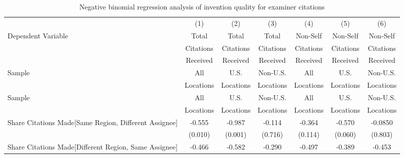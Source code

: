 \begin{table}[htbp]\centering
\caption{Negative binomial regression analysis of invention quality for examiner citations \label{e.model123192021}}
\small
\onehalfspacing
\begin{adjustbox}{angle=90}
\begin{tabular}{l*{6}{c}}
\hline\hline
                &\multicolumn{1}{c}{(1)}&\multicolumn{1}{c}{(2)}&\multicolumn{1}{c}{(3)}&\multicolumn{1}{c}{(4)}&\multicolumn{1}{c}{(5)}&\multicolumn{1}{c}{(6)}\\
 \multirow{3}{*}{Dependent Variable} &\multicolumn{1}{c}{Total}&\multicolumn{1}{c}{Total}&\multicolumn{1}{c}{Total}&\multicolumn{1}{c}{Non-Self}&\multicolumn{1}{c}{Non-Self}&\multicolumn{1}{c}{Non-Self}\\
                &\multicolumn{1}{c}{Citations}&\multicolumn{1}{c}{Citations}&\multicolumn{1}{c}{Citations}&\multicolumn{1}{c}{Citations}&\multicolumn{1}{c}{Citations}&\multicolumn{1}{c}{Citations}\\
                 &\multicolumn{1}{c}{Received}&\multicolumn{1}{c}{Received}&\multicolumn{1}{c}{Received}&\multicolumn{1}{c}{Received}&\multicolumn{1}{c}{Received}&\multicolumn{1}{c}{Received}\\
                 \hline
 \multirow{2}{*}{Sample}&\multicolumn{1}{c}{All}&\multicolumn{1}{c}{U.S.}&\multicolumn{1}{c}{Non-U.S.}&\multicolumn{1}{c}{All}&\multicolumn{1}{c}{U.S.}&\multicolumn{1}{c}{Non-U.S.}\\       
  &\multicolumn{1}{c}{Locations}&\multicolumn{1}{c}{Locations}&\multicolumn{1}{c}{Locations}&\multicolumn{1}{c}{Locations}&\multicolumn{1}{c}{Locations}&\multicolumn{1}{c}{Locations}\\       
                 \hline
 \multirow{2}{*}{Sample}&\multicolumn{1}{c}{All}&\multicolumn{1}{c}{U.S.}&\multicolumn{1}{c}{Non-U.S.}&\multicolumn{1}{c}{All}&\multicolumn{1}{c}{U.S.}&\multicolumn{1}{c}{Non-U.S.}\\       
  &\multicolumn{1}{c}{Locations}&\multicolumn{1}{c}{Locations}&\multicolumn{1}{c}{Locations}&\multicolumn{1}{c}{Locations}&\multicolumn{1}{c}{Locations}&\multicolumn{1}{c}{Locations}\\    \hline
Share Citations Made[Same Region, Different Assignee]&   -0.555&   -0.987&   -0.114&   -0.364&   -0.570&  -0.0850\\
                &  (0.010)&  (0.001)&  (0.716)&  (0.114)&  (0.060)&  (0.803)\\
Share Citations Made[Different Region, Same Assignee]&   -0.466&   -0.582&   -0.290&   -0.497&   -0.389&   -0.453\\

\end{tabular}
\end{adjustbox}
\end{table}
